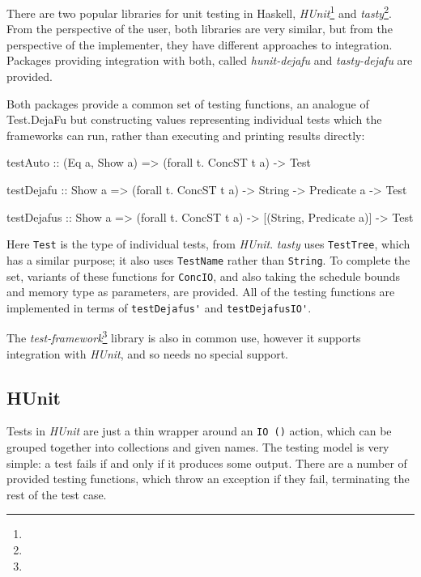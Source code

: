 There are two popular libraries for unit testing in Haskell,
\emph{HUnit}\footnote{} and
\emph{tasty}\footnote{}. From the perspective of the
user, both libraries are very similar, but from the perspective of the
implementer, they have different approaches to integration. Packages
providing integration with both, called \emph{hunit-dejafu} and
\emph{tasty-dejafu} are provided.

Both packages provide a common set of testing functions, an analogue
of Test.\-DejaFu but constructing values representing individual tests
which the frameworks can run, rather than executing and printing
results directly:

\begin{haskellcode}
testAuto :: (Eq a, Show a)
  => (forall t. ConcST t a) -> Test

testDejafu :: Show a
  => (forall t. ConcST t a) -> String -> Predicate a -> Test

testDejafus :: Show a
  => (forall t. ConcST t a) -> [(String, Predicate a)] -> Test
\end{haskellcode}

Here \verb|Test| is the type of individual tests, from
\emph{HUnit}. \emph{tasty} uses \verb|TestTree|, which has a similar
purpose; it also uses \verb|TestName| rather than \verb|String|. To
complete the set, variants of these functions for \verb|ConcIO|, and
also taking the schedule bounds and memory type as parameters, are
provided. All of the testing functions are implemented in terms of
\verb|testDejafus'| and \verb|testDejafusIO'|.

The \emph{test-framework}\footnote{} library
is also in common use, however it supports integration with
\emph{HUnit}, and so needs no special support.

\subsection{HUnit}
\label{sec:practice-integration-hunit}

Tests in \emph{HUnit} are just a thin wrapper around an \verb|IO ()|
action, which can be grouped together into collections and given
names. The testing model is very simple: a test fails if and only if
it produces some output. There are a number of provided testing
functions, which throw an exception if they fail, terminating the rest
of the test case.


